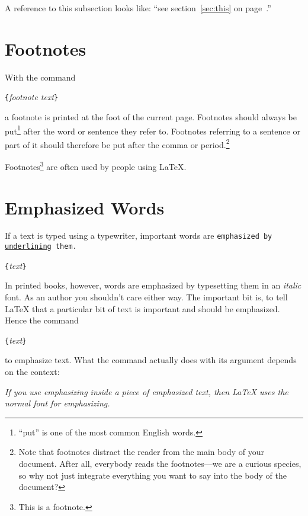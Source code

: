 \begin{example}
A reference to this subsection
\label{sec:this} looks like:
``see section~\ref{sec:this} on
page~\pageref{sec:this}.''
\end{example}

\section{Footnotes}
With the command
\begin{lscommand}
\verb|{|\emph{footnote text}\verb|}|
\end{lscommand}
\noindent a footnote is printed at the foot of the current page.  Footnotes
should always be put\footnote{``put'' is one of the most common
  English words.} after the word or sentence they refer to. Footnotes
referring to a sentence or part of it should therefore be put after
the comma or period.\footnote{Note that footnotes
  distract the reader from the main body of your document. After all,
  everybody reads the footnotes---we are a curious species, so why not
  just integrate everything you want to say into the body of the
  document?\footnotemark}

\begin{example}
Footnotes\footnote{This is
  a footnote.} are often used
by people using \LaTeX.
\end{example}

\section{Emphasized Words}

If a text is typed using a typewriter, important words are
  \texttt{emphasized by \underline{underlining} them.}
\begin{lscommand}
\verb|{|\emph{text}\verb|}|
\end{lscommand}
In printed books,
however, words are emphasized by typesetting them in an \emph{italic}
font.  As an author you shouldn't care either way. The important bit is, to tell \LaTeX{} that a
particular bit of text is important and should be emphasized. Hence the command
\begin{lscommand}
\verb|{|\emph{text}\verb|}|
\end{lscommand}
\noindent to emphasize text. What the command actually does with
its argument depends on the context:

\begin{example}
\emph{If you use
  emphasizing inside a piece
  of emphasized text, then
  \LaTeX{} uses the
  \emph{normal} font for
  emphasizing.}
\end{example}

